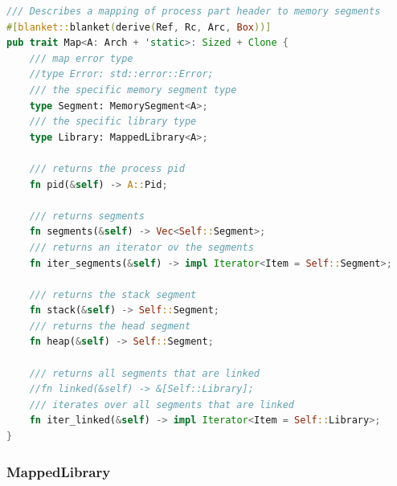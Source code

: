 \begin{lstlisting}[caption=\label{lst:map}"The Memory Map Trait definition", language=Rust]
 /// Describes a mapping of process part header to memory segments
#[blanket::blanket(derive(Ref, Rc, Arc, Box))]
pub trait Map<A: Arch + 'static>: Sized + Clone {
    /// map error type
    //type Error: std::error::Error;
    /// the specific memory segment type
    type Segment: MemorySegment<A>;
    /// the specific library type
    type Library: MappedLibrary<A>;

    /// returns the process pid
    fn pid(&self) -> A::Pid;

    /// returns segments
    fn segments(&self) -> Vec<Self::Segment>;
    /// returns an iterator ov the segments
    fn iter_segments(&self) -> impl Iterator<Item = Self::Segment>;

    /// returns the stack segment
    fn stack(&self) -> Self::Segment;
    /// returns the head segment
    fn heap(&self) -> Self::Segment;

    /// returns all segments that are linked
    //fn linked(&self) -> &[Self::Library];
    /// iterates over all segments that are linked
    fn iter_linked(&self) -> impl Iterator<Item = Self::Library>;
}   
\end{lstlisting}

 \subsubsection{MappedLibrary}
 \label{reader:mapped_lib} 

